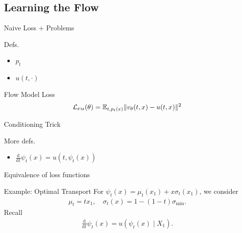 \documentclass{beamer}
\begin{document}
\subsection{Learning the Flow}
\begin{frame}{Naive Loss + Problems}
    \begin{minipage}{0.46\textwidth}
        \begin{block}{Defs.}
            \begin{itemize}
                \item \( p_t \)
                \item \( u(t, \cdot) \)
            \end{itemize}
        \end{block}
    \end{minipage}
    \begin{block}{Flow Model Loss}
        \[ \mathcal{L}_{\text{\tiny FM}}(\theta) = \mathbb{E}_{t, p_t(x)} \|v_{\theta}(t, x) - u(t, x)\|^2 \]
    \end{block}
\end{frame}

\begin{frame}{Conditioning Trick}
    \begin{minipage}{0.46\textwidth}
        \begin{block}{More defs.}
            \begin{itemize}
                \item \( \frac{\mathrm{d}}{\mathrm{d}t}\psi_t(x) = u(t, \psi_t(x)) \)
            \end{itemize}
        \end{block}
    \end{minipage}
\end{frame}

\begin{frame}{Equivalence of loss functions}
    
\end{frame}
\begin{frame}{Example: Optimal Transport}
    For \( \psi_t(x) = \mu_t(x_{1}) + x \sigma_t(x_{1}) \), we consider
    \begin{align*}
        \mu_t = tx_{1}, \quad \sigma_t(x) = 1 - (1 - t)\sigma_{\min}
    .\end{align*}
    Recall
    \begin{align*}
        \frac{\mathrm{d}}{\mathrm{d}t} \psi_t(x) = u(\psi_t(x) \mid X_{1})
    .\end{align*}
\end{frame}
\end{document}
